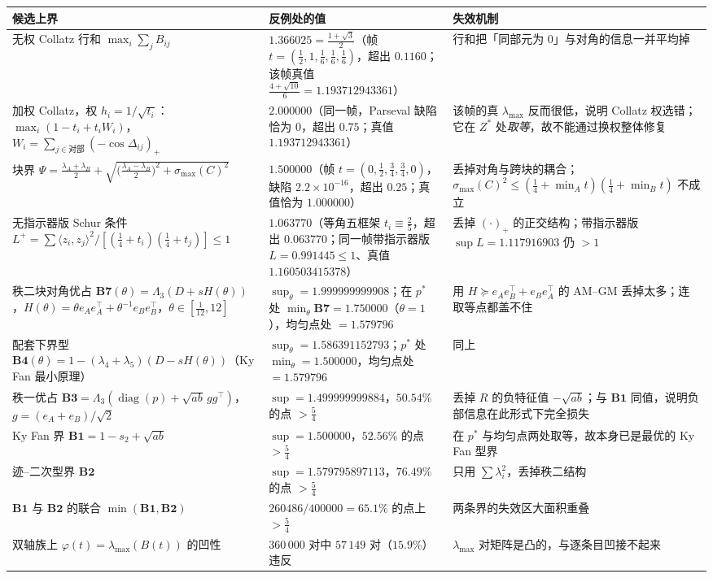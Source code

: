 \documentclass[UTF8,11pt]{ctexart}
\theoremstyle{definition}
\newcommand{\Lam}{\Lambda}
\begin{document}
\begin{center}\small
\begin{tabular}{p{} p{} p{}}
\toprule
候选上界 & 反例处的值 & 失效机制\\
\midrule
无权 Collatz 行和 $\max_i\sum_jB_{ij}$ & $1.366025=\frac{1+\sqrt3}2$（帧 $t=(\frac12,1,\frac16,\frac16,\frac16)$，超出 $0.1160$；该帧真值 $\frac{4+\sqrt{10}}6=1.193712943361$） & 行和把「同部元为 $0$」与对角的信息一并平均掉\\
加权 Collatz，权 $h_i=1/\sqrt{t_i}$：$\max_i(1-t_i+t_iW_i)$，$W_i=\sum_{j\in\text{对部}}(-\cos\Delta_{ij})_+$ & $2.000000$（同一帧，Parseval 缺陷恰为 $0$，超出 $0.75$；真值 $1.193712943361$）
 & 该帧的真 $\lambda_{\max}$ 反而很低，说明 Collatz 权选错；它在 $Z^\ast$ 处\emph{取等}，故不能通过换权整体修复\\
块界 $\Psi=\frac{\lambda_A+\lambda_B}2+\sqrt{\bigl(\frac{\lambda_A-\lambda_B}2\bigr)^2+\sigma_{\max}(C)^2}$ & $1.500000$（帧 $t=(0,\frac12,\frac34,\frac34,0)$，缺陷 $2.2\times10^{-16}$，超出 $0.25$；真值恰为 $1.000000$） & 丢掉对角与跨块的耦合；$\sigma_{\max}(C)^2\le(\frac14+\min_At)(\frac14+\min_Bt)$ 不成立\\
无指示器版 Schur 条件 $L^+=\sum\langle z_i,z_j\rangle^2/[(\frac14+t_i)(\frac14+t_j)]\le1$ & $1.063770$（等角五框架 $t_i\equiv\frac25$，超出 $0.063770$；同一帧带指示器版 $L=0.991445\le1$、真值 $1.160503415378$） & 丢掉 $(\cdot)_+$ 的正交结构；带指示器版 $\sup L=1.117916903$ 仍 $>1$\\
秩二块对角优占 $\mathbf{B7}(\theta)=\Lam_3(D+sH(\theta))$，$H(\theta)=\theta e_Ae_A^\top+\theta^{-1}e_Be_B^\top$，$\theta\in[\frac1{12},12]$ & $\sup_\theta=1.999999999908$；在 $p^\ast$ 处 $\min_\theta\mathbf{B7}=1.750000$（$\theta=1$），均匀点处 $=1.579796$ & 用 $H\succeq e_Ae_B^\top+e_Be_A^\top$ 的 AM--GM 丢掉太多；连取等点都盖不住\\
配套下界型 $\mathbf{B4}(\theta)=1-(\lambda_4{+}\lambda_5)(D-sH(\theta))$（Ky Fan 最小原理） & $\sup_\theta=1.586391152793$；$p^\ast$ 处 $\min_\theta=1.500000$，均匀点处 $=1.579796$ & 同上\\
秩一优占 $\mathbf{B3}=\Lam_3(\operatorname{diag}(p)+\sqrt{ab}\,gg^\top)$，$g=(e_A{+}e_B)/\sqrt2$ & $\sup=1.499999999884$，$50.54\%$ 的点 $>\frac54$ & 丢掉 $R$ 的负特征值 $-\sqrt{ab}$；与 $\mathbf{B1}$ 同值，说明负部信息在此形式下完全损失\\
Ky Fan 界 $\mathbf{B1}=1-s_2+\sqrt{ab}$ & $\sup=1.500000$，$52.56\%$ 的点 $>\frac54$ & 在 $p^\ast$ 与均匀点两处取等，故本身已是最优的 Ky Fan 型界\\
迹--二次型界 $\mathbf{B2}$ & $\sup=1.579795897113$，$76.49\%$ 的点 $>\frac54$ & 只用 $\sum\lambda_i^2$，丢掉秩二结构\\
$\mathbf{B1}$ 与 $\mathbf{B2}$ 的联合 $\min(\mathbf{B1},\mathbf{B2})$ & $260486/400000=65.1\%$ 的点上 $>\frac54$ & 两条界的失效区大面积重叠\\
双轴族上 $\varphi(t)=\lambda_{\max}(B(t))$ 的凹性 & $360\,000$ 对中 $57\,149$ 对（$15.9\%$）违反 & $\lambda_{\max}$ 对矩阵是凸的，与逐条目凹接不起来\\
\bottomrule
\end{tabular}
\end{center}
\end{document}
